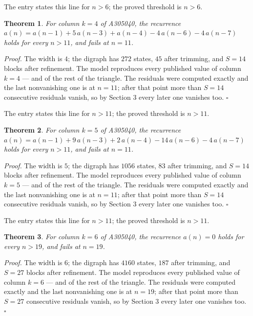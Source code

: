 \documentclass[11pt]{article}
\newtheorem{theorem}{Theorem}
\theoremstyle{definition}
\begin{document}
The entry states this line for $n > 6$; the proved threshold is $n > 6$.

\begin{theorem} For column $k = 4$ of A305040, the recurrence $a(n) = a(n-1) + 5\,a(n-3) + a(n-4) - 4\,a(n-6) - 4\,a(n-7)$ holds for every $n > 11$, and fails at $n = 11$.\end{theorem}

{\itshape Proof.} The width is $4$; the digraph has $272$ states, $45$ after trimming, and $S = 14$ blocks after refinement. The model reproduces every published value of column $k = 4$ --- and of the rest of the triangle. The residuals were computed exactly and the last nonvanishing one is at $n = 11$; after that point more than $S = 14$ consecutive residuals vanish, so by Section 3 every later one vanishes too. $\square$

The entry states this line for $n > 11$; the proved threshold is $n > 11$.

\begin{theorem} For column $k = 5$ of A305040, the recurrence $a(n) = a(n-1) + 9\,a(n-3) + 2\,a(n-4) - 14\,a(n-6) - 4\,a(n-7)$ holds for every $n > 11$, and fails at $n = 11$.\end{theorem}

{\itshape Proof.} The width is $5$; the digraph has $1056$ states, $83$ after trimming, and $S = 14$ blocks after refinement. The model reproduces every published value of column $k = 5$ --- and of the rest of the triangle. The residuals were computed exactly and the last nonvanishing one is at $n = 11$; after that point more than $S = 14$ consecutive residuals vanish, so by Section 3 every later one vanishes too. $\square$

The entry states this line for $n > 11$; the proved threshold is $n > 11$.

\begin{theorem} For column $k = 6$ of A305040, the recurrence $a(n) = 0$ holds for every $n > 19$, and fails at $n = 19$.\end{theorem}

{\itshape Proof.} The width is $6$; the digraph has $4160$ states, $187$ after trimming, and $S = 27$ blocks after refinement. The model reproduces every published value of column $k = 6$ --- and of the rest of the triangle. The residuals were computed exactly and the last nonvanishing one is at $n = 19$; after that point more than $S = 27$ consecutive residuals vanish, so by Section 3 every later one vanishes too. $\square$
\end{document}
